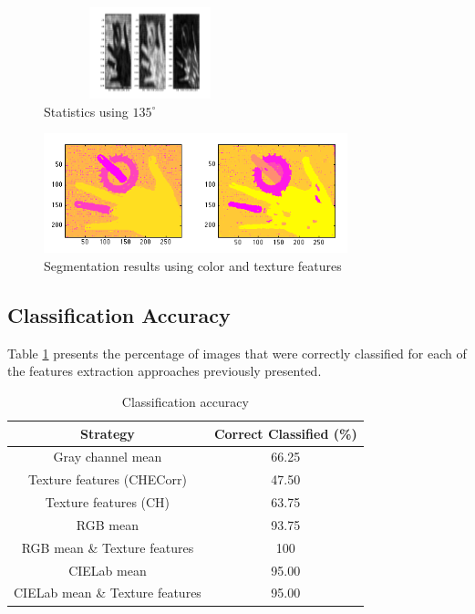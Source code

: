 \documentclass{IEEEtran}
\begin{document}
\begin{figure}[h!] 
 \centering
 \includegraphics[width=175pt,height=75pt]{./fig/hand/fstats_1_135_end_5.png}%
 \caption{Statistics using $135^{\circ}$}
 \label{fig:feli_135}
\end{figure}


\begin{figure}[h!] 
 \centering
 \includegraphics[width=250pt]{./fig/hand/res_1_all_w15_end_5.png}%
 \caption{Segmentation results using color and texture features}
 \label{fig:feli_seg}
\end{figure}

\subsection{Classification Accuracy}

Table \ref{tb:accuracy_class} presents the percentage of images that were correctly classified for each of the features extraction approaches previously presented.\\


\begin{table}[h!] 
\centering
\begin{tabular}{|c|c|}
\hline
\textbf{Strategy} & \textbf{Correct Classified (\%)} \\
\hline
Gray channel mean & 66.25  \\
\hline
Texture features (CHECorr) & 47.50  \\ %
\hline
Texture features (CH) & 63.75  \\ %
\hline
RGB mean & 93.75 \\
\hline
RGB mean \& Texture features & 100 \\ %
\hline
CIELab mean & 95.00  \\
\hline
CIELab mean \& Texture features & 95.00  \\
\hline
\end{tabular}
\caption{Classification accuracy}
\label{tb:accuracy_class}
\end{table}
\end{document}
